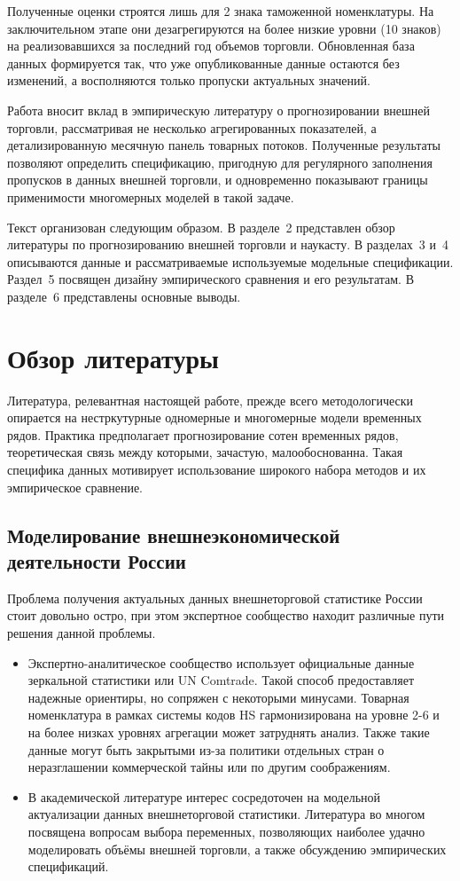 \documentclass[12pt]{article}
\begin{document}
Полученные оценки строятся лишь для 2 знака таможенной номенклатуры. На заключительном этапе они дезагрегируются на более низкие уровни (10 знаков) на реализовавшихся за последний год объемов торговли. Обновленная база данных формируется так, что уже опубликованные данные остаются без изменений, а восполняются только пропуски актуальных значений.

Работа вносит вклад в эмпирическую литературу о прогнозировании внешней торговли, рассматривая не несколько агрегированных показателей, а детализированную месячную панель товарных потоков. Полученные результаты позволяют определить спецификацию, пригодную для регулярного заполнения пропусков в данных внешней торговли, и одновременно показывают границы применимости многомерных моделей в такой задаче.

Текст организован следующим образом. В разделе~2 представлен обзор литературы по прогнозированию внешней торговли и наукасту. В разделах~3 и~4 описываются данные и рассматриваемые используемые модельные спецификации. Раздел~5 посвящен дизайну эмпирического сравнения и его результатам. В разделе~6 представлены основные выводы.

\section{Обзор литературы}

Литература, релевантная настоящей работе, прежде всего методологически опирается на нестркутурные одномерные и многомерные модели временных рядов. Практика предполагает прогнозирование сотен временных рядов, теоретическая связь между которыми, зачастую, малообоснованна. Такая специфика данных мотивирует использование широкого набора методов и их эмпирическое сравнение.

\subsection{Моделирование внешнеэкономической деятельности России}

Проблема получения актуальных данных внешнеторговой статистике России стоит довольно остро, при этом экспертное сообщество находит различные пути решения данной проблемы.

\begin{itemize}
	\item Экспертно-аналитическое сообщество использует официальные данные зеркальной статистики или UN Comtrade. Такой способ предоставляет надежные ориентиры, но сопряжен с некоторыми минусами. Товарная номенклатура в рамках системы кодов HS гармонизирована на уровне 2-6 и на более низках уровнях агрегации может затруднять анализ. Также такие данные могут быть закрытыми из-за политики отдельных стран о неразглашении коммерческой тайны или по другим соображениям.
	\item В академической литературе интерес сосредоточен на модельной актуализации данных внешнеторговой статистики. Литература во многом посвящена вопросам выбора переменных, позволяющих наиболее удачно моделировать объёмы внешней торговли, а также обсуждению эмпирических спецификаций.
\end{itemize}
\end{document}
